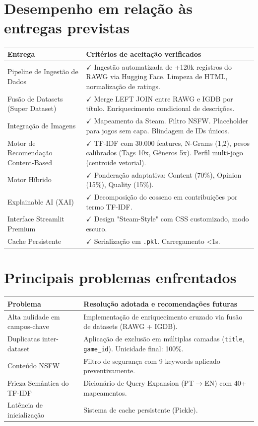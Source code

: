 \documentclass[12pt,a4paper]{article}
\begin{document}
\section{Desempenho em relação às entregas previstas}

\begin{longtable}{p{5cm} p{10cm}}
\toprule
\textbf{Entrega} & \textbf{Critérios de aceitação verificados} \\
\midrule
\endhead
Pipeline de Ingestão de Dados & $\checkmark$ Ingestão automatizada de +120k registros do RAWG via Hugging Face. Limpeza de HTML, normalização de ratings. \\
Fusão de Datasets (Super Dataset) & $\checkmark$ Merge LEFT JOIN entre RAWG e IGDB por título. Enriquecimento condicional de descrições. \\
Integração de Imagens & $\checkmark$ Mapeamento da Steam. Filtro NSFW. Placeholder para jogos sem capa. Blindagem de IDs únicos. \\
Motor de Recomendação Content-Based & $\checkmark$ TF-IDF com 30.000 features, N-Grams (1,2), pesos calibrados (Tags 10x, Gêneros 5x). Perfil multi-jogo (centroide vetorial). \\
Motor Híbrido & $\checkmark$ Ponderação adaptativa: Content (70\%), Opinion (15\%), Quality (15\%). \\
Explainable AI (XAI) & $\checkmark$ Decomposição do cosseno em contribuições por termo TF-IDF. \\
Interface Streamlit Premium & $\checkmark$ Design "Steam-Style" com CSS customizado, modo escuro. \\
Cache Persistente & $\checkmark$ Serialização em \texttt{.pkl}. Carregamento <1s. \\
\bottomrule
\end{longtable}

\section{Principais problemas enfrentados}

\begin{longtable}{p{5cm} p{10cm}}
\toprule
\textbf{Problema} & \textbf{Resolução adotada e recomendações futuras} \\
\midrule
\endhead
Alta nulidade em campos-chave & Implementação de enriquecimento cruzado via fusão de datasets (RAWG + IGDB). \\
Duplicatas inter-dataset & Aplicação de exclusão em múltiplas camadas (\texttt{title}, \texttt{game\_id}). Unicidade final: 100\%. \\
Conteúdo NSFW & Filtro de segurança com 9 keywords aplicado preventivamente. \\
Frieza Semântica do TF-IDF & Dicionário de Query Expansion (PT$\rightarrow$EN) com 40+ mapeamentos. \\
Latência de inicialização & Sistema de cache persistente (Pickle). \\
\bottomrule
\end{longtable}
\end{document}
